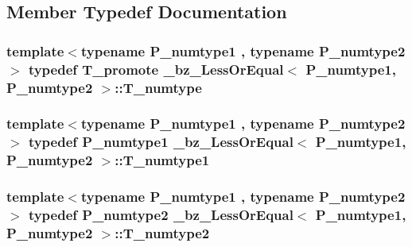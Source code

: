 \subsection{Member Typedef Documentation}
\hypertarget{class__bz__LessOrEqual_a1894ea38a7ceb298ee1f0ea82281ea19}{}
\subsubsection[{T\+\_\+numtype}]{\setlength{\rightskip}{0pt plus 5cm}template$<$typename P\+\_\+numtype1 , typename P\+\_\+numtype2 $>$ typedef {\bf T\+\_\+promote} {\bf \+\_\+bz\+\_\+\+Less\+Or\+Equal}$<$ P\+\_\+numtype1, P\+\_\+numtype2 $>$\+::{\bf T\+\_\+numtype}}\label{class__bz__LessOrEqual_a1894ea38a7ceb298ee1f0ea82281ea19}
\hypertarget{class__bz__LessOrEqual_ab7d366bc9b6d6de1a4ea5562470ca821}{}
\subsubsection[{T\+\_\+numtype1}]{\setlength{\rightskip}{0pt plus 5cm}template$<$typename P\+\_\+numtype1 , typename P\+\_\+numtype2 $>$ typedef P\+\_\+numtype1 {\bf \+\_\+bz\+\_\+\+Less\+Or\+Equal}$<$ P\+\_\+numtype1, P\+\_\+numtype2 $>$\+::{\bf T\+\_\+numtype1}}\label{class__bz__LessOrEqual_ab7d366bc9b6d6de1a4ea5562470ca821}
\hypertarget{class__bz__LessOrEqual_ac67f5a49135121a7ee9aebf2d2fc7c26}{}
\subsubsection[{T\+\_\+numtype2}]{\setlength{\rightskip}{0pt plus 5cm}template$<$typename P\+\_\+numtype1 , typename P\+\_\+numtype2 $>$ typedef P\+\_\+numtype2 {\bf \+\_\+bz\+\_\+\+Less\+Or\+Equal}$<$ P\+\_\+numtype1, P\+\_\+numtype2 $>$\+::{\bf T\+\_\+numtype2}}\label{class__bz__LessOrEqual_ac67f5a49135121a7ee9aebf2d2fc7c26}
\hypertarget{class__bz__LessOrEqual_af5192608c2dfc73d014324e6e1c9b313}{}
